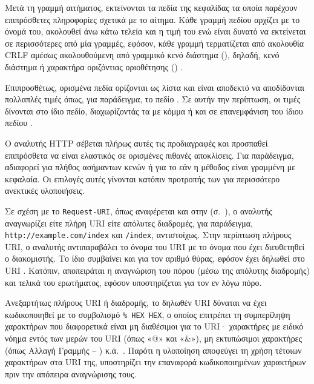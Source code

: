 Μετά τη γραμμή αιτήματος, εκτείνονται τα πεδία της κεφαλίδας τα οποία παρέχουν
επιπρόσθετες πληροφορίες σχετικά με το αίτημα. Κάθε γραμμή πεδίου αρχίζει με το
όνομά του, ακολουθεί άνω κάτω τελεία και η τιμή του ενώ είναι δυνατό να
εκτείνεται σε περισσότερες από μία γραμμές, εφόσον, κάθε γραμμή τερματίζεται
από ακολουθία CRLF αμέσως ακολουθούμενη από γραμμικό κενό διάστημα
(), δηλαδή, κενό διάστημα ή χαρακτήρα οριζόντιας
οριοθέτησης () \parencite[31--32]{rfc2616}.

Επιπροσθέτως, ορισμένα πεδία ορίζονται ως λίστα και είναι αποδεκτό να
αποδίδονται πολλαπλές τιμές όπως, για παράδειγμα, το πεδίο 
\parencite[32,100]{rfc2616}. Σε αυτήν την περίπτωση, οι τιμές δίνονται στο ίδιο
πεδίο, διαχωρίζοντάς τα με κόμμα ή και σε επανεμφάνιση του ίδιου πεδίου
\parencite[32]{rfc2616}.


Ο αναλυτής HTTP σέβεται πλήρως αυτές τις προδιαγραφές και προσπαθεί επιπρόσθετα
να είναι ελαστικός σε ορισμένες πιθανές αποκλίσεις. Για παράδειγμα, αδιαφορεί
για πλήθος ασήμαντων κενών ή για το εάν η μέθοδος είναι γραμμένη με κεφαλαία. Οι
επιλογές αυτές γίνονται κατόπιν προτροπής των \textcite[166]{rfc2616} για
περισσότερο ανεκτικές υλοποιήσεις.

Σε σχέση με το \verb~Request-URI~, όπως αναφέρεται και στην
(σ.~\pageref{ssubsec:network:resource-general}), ο αναλυτής αναγνωρίζει είτε
πλήρη URI είτε απόλυτες διαδρομές, για παράδειγμα,
\verb~http://example.com/index~ και \verb~/index~, αντιστοίχως. Στην περίπτωση
πλήρους URI, ο αναλυτής αντιπαραβάλει το όνομα του URI με το όνομα που έχει
διευθετηθεί ο διακομιστής. Το ίδιο συμβαίνει και για τον αριθμό θύρας, εφόσον
έχει δηλωθεί στο URI \parencite[49]{rfc3986}. Κατόπιν, αποπειράται η αναγνώριση
του πόρου (μέσω της απόλυτης διαδρομής) και τελικά του ερωτήματος, εφόσον
υποστηρίζεται για τον εν λόγω πόρο.

Ανεξαρτήτως πλήρους URI ή διαδρομής, το δηλωθέν URI δύναται να έχει
κωδικοποιηθεί με το συμβολισμό \verb~% HEX HEX~, ο οποίος επιτρέπει τη
συμπερίληψη χαρακτήρων που διαφορετικά είναι μη διαθέσιμοι για το URI·
χαρακτήρες με ειδικό νόημα εντός των μερών του URI (όπως «@» και «\&»), μη
εκτυπώσιμοι χαρακτήρες (όπως Αλλαγή Γραμμής -- ) κ.ά.\
\parencite[9--11]{rfc2396}. Παρότι η υλοποίηση αποφεύγει τη χρήση τέτοιων
χαρακτήρων στα URI της, υποστηρίζει την επαναφορά κωδικοποιημένων χαρακτήρων
πριν την απόπειρα αναγνώρισης τους.

